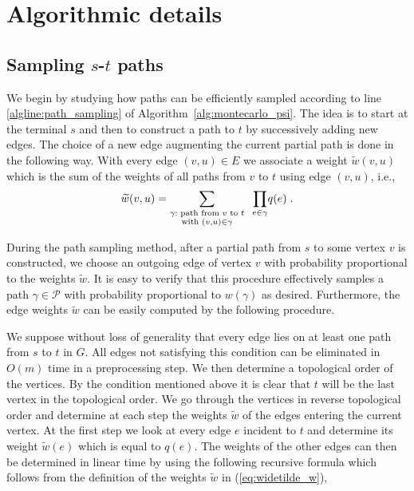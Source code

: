 \documentclass{article}
\begin{document}
\section{Algorithmic details}\label{sec:technical_details}

\subsection{Sampling \texorpdfstring{{$s$}-{$t$}}{$s$-$t$} paths}

We begin by studying how paths can be efficiently sampled
according to line \ref{algline:path_sampling} of Algorithm~\ref{alg:montecarlo_psi}.
The idea is to start at the terminal
$s$ and then to construct a path to $t$ by successively
adding new edges. The choice of a new edge augmenting the
current partial path is done in the following way. With every
edge $(v,u)\in E$ we associate a weight $\widetilde{w}(v,u)$
which is the sum of the weights of all paths from $v$ to $t$
using edge $(v,u)$, i.e.,
\begin{equation}\label{eq:widetilde_w}
\widetilde{w}(v,u)=
\sum_{\begin{subarray}{c}
\gamma: \text{ path from $v$ to $t$}\\
    \text{with }(v,u)\in\gamma
\end{subarray}}
\;\;\underset{e\in\gamma}{\prod}q(e)\;.
\end{equation}

During the path sampling method, after a partial path from
$s$ to some vertex $v$ is constructed, we choose an
outgoing edge of vertex $v$ with probability
proportional to the weights $\widetilde{w}$. It is easy to
verify that this procedure effectively samples a path
$\gamma\in\mathcal{P}$ with probability proportional to
$w(\gamma)$ as desired. Furthermore, the edge weights
$\widetilde{w}$ can be easily computed by the following
procedure.

We suppose without loss of generality that every edge lies
on at least one path from $s$ to $t$ in $G$. All edges not
satisfying this condition can be eliminated in $O(m)$ time
in a preprocessing step. We then determine a
topological order of the vertices. By the condition mentioned above
it is clear that $t$ will be the last vertex in
the topological order. We go through the vertices in reverse topological order
and determine at each step the weights $\widetilde{w}$ of the
edges entering the current vertex. At the first step we look
at every edge $e$ incident to $t$ and determine its weight
$\widetilde{w}(e)$ which is equal to $q(e)$. The weights of
the other edges can then be determined in linear time
by using the following recursive
formula which follows from the definition of the weights
$\widetilde{w}$ in (\ref{eq:widetilde_w}),
\end{document}
